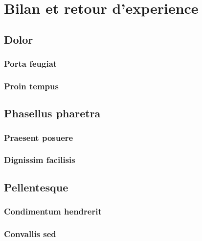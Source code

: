 \chapter{Bilan et retour d'experience}

	\section{Dolor}

		\subsection{Porta feugiat}

			\lipsum[2-3]
			
		\subsection{Proin tempus}
		
			\lipsum[4-6]

	\section{Phasellus pharetra}
	
		\subsection{Praesent posuere}
		
			\lipsum[6-9]
			
		\subsection{Dignissim facilisis}
		
			\lipsum[10-12]
			
	\section{Pellentesque}
	
		\subsection{Condimentum hendrerit}
		
			\lipsum[13-14]
			
		\subsection{Convallis sed}
		
			\lipsum[15-17]
